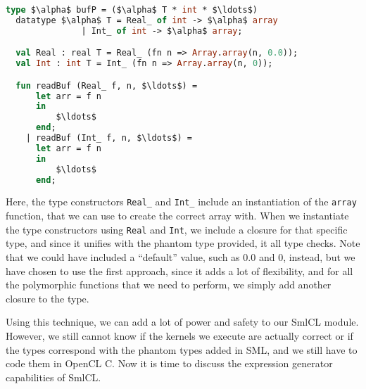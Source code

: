 \begin{lstlisting}[language=ML, caption=readBuf implementation using
    closures,mathescape]
  type $\alpha$ bufP = ($\alpha$ T * int * $\ldots$)
  datatype $\alpha$ T = Real_ of int -> $\alpha$ array
               | Int_ of int -> $\alpha$ array;

  val Real : real T = Real_ (fn n => Array.array(n, 0.0));
  val Int : int T = Int_ (fn n => Array.array(n, 0));

  fun readBuf (Real_ f, n, $\ldots$) =
      let arr = f n
      in
          $\ldots$
      end;
    | readBuf (Int_ f, n, $\ldots$) =
      let arr = f n
      in
          $\ldots$
      end;
\end{lstlisting}

Here, the type constructors \texttt{Real\_} and \texttt{Int\_} include
an instantiation of the \texttt{array} function, that we can use to
create the correct array with. When we instantiate the type
constructors using \texttt{Real} and \texttt{Int}, we include a
closure for that specific type, and since it unifies with the phantom
type provided, it all type checks. Note that we could have included a
``default'' value, such as $0.0$ and $0$, instead, but we have chosen
to use the first approach, since it adds a lot of flexibility, and for
all the polymorphic functions that we need to perform, we simply add
another closure to the type.

Using this technique, we can add a lot of power and safety to our
SmlCL module. However, we still cannot know if the kernels we execute
are actually correct or if the types correspond with the phantom
types added in SML, and we still have to code them in OpenCL C. Now it
is time to discuss the expression generator capabilities of SmlCL.

